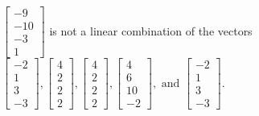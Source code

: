 \begin{exercise}
\begin{exerciseStatement}
  \end{exerciseStatement}
  \begin{exerciseAnswer}
   \(\left[\begin{array}{c}
-9 \\
-10 \\
-3 \\
1
\end{array}\right]\) 
  	 is not  
	a linear combination of the vectors \(\left[\begin{array}{c}
-2 \\
1 \\
3 \\
-3
\end{array}\right] , \left[\begin{array}{c}
4 \\
2 \\
2 \\
2
\end{array}\right] , \left[\begin{array}{c}
4 \\
2 \\
2 \\
2
\end{array}\right] , \left[\begin{array}{c}
4 \\
6 \\
10 \\
-2
\end{array}\right] , \text{ and } \left[\begin{array}{c}
-2 \\
1 \\
3 \\
-3
\end{array}\right]\).

	
  


  \end{exerciseAnswer}
\end{exercise}
